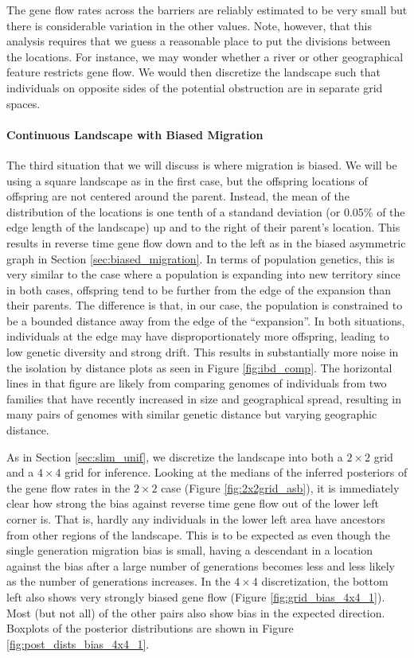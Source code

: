 \documentclass{article}
\begin{document}
The gene flow rates across the barriers are reliably estimated to be very small
but there is considerable variation in the other values.
Note, however, that this analysis requires that we guess a reasonable place
to put the divisions between the locations.
For instance, we may wonder whether a river or other geographical feature
restricts gene flow.
We would then discretize the landscape such that individuals on opposite sides of the 
potential obstruction are in separate grid spaces.


\paragraph{Continuous Landscape with Biased Migration}
The third situation that we will discuss is where migration is biased.
We will be using a square landscape as in the first case, 
but the offspring locations of offspring are not centered around the parent.
Instead, the mean of the distribution of the locations
is one tenth of a standand deviation (or 0.05\% of the edge length of the landscape) 
up and to the right of their parent's location.
This results in reverse time gene flow down and to the left 
as in the biased asymmetric graph in Section \ref{sec:biased_migration}.
In terms of population genetics, 
this is very similar to the case where a population is expanding into new territory 
since in both cases, 
offspring tend to be further from the edge of the expansion than their parents.
The difference is that, in our case, 
the population is constrained to be a bounded distance 
away from the edge of the ``expansion''.
In both situations, individuals at the edge may have disproportionately more offspring,
leading to low genetic diversity and strong drift.
This results in substantially more noise in the isolation by distance plots 
as seen in Figure \ref{fig:ibd_comp}. 
The horizontal lines in that figure are likely from comparing genomes of individuals from
two families that have recently increased in size and geographical spread, 
resulting in many pairs of genomes with similar genetic distance 
but varying geographic distance.

As in Section \ref{sec:slim_unif}, we discretize the landscape into
both a $2 \times 2$ grid and a $4 \times 4$ grid for inference.
Looking at the medians of the inferred posteriors of the gene flow rates in the $2 \times 2$ case
(Figure \ref{fig:2x2grid_asb}),
it is immediately clear how strong the bias 
against reverse time gene flow out of the lower left corner is.
That is, hardly any individuals in the lower left area have ancestors
from other regions of the landscape.
This is to be expected as even though the single generation migration bias is small,
having a descendant in a location against the bias after a large number of generations
becomes less and less likely as the number of generations increases.
In the $4 \times 4$ discretization, 
the bottom left also shows very strongly biased gene flow (Figure \ref{fig:grid_bias_4x4_1}).
Most (but not all) of the other pairs also show bias in the expected direction.
Boxplots of the posterior distributions are shown in Figure \ref{fig:post_dists_bias_4x4_1}.
\end{document}
